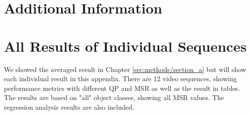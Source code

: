 \chapter{Additional Information}





\chapter{All Results of Individual Sequences}
We showed the averaged result in Chapter \ref{sec:methods/section_a} but will show each individual result in this appendix. There are 12 video sequences, showing performance metrics with different QP and MSR as well as the result in tables. The results are based on "all" object classes, showing all MSR values. The regression analysis results are also included. 

\newpage

\newpage

\newpage

\newpage

\newpage

\newpage

\newpage

\newpage

\newpage

\newpage

\newpage

\newpage







